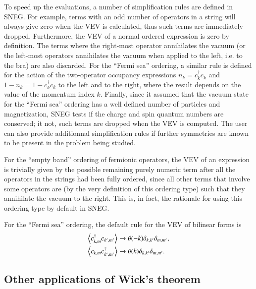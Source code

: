 \documentclass[3p,number,preprint]{elsarticle}
\begin{document}
To speed up the evaluations, a number of simplification rules are
defined in SNEG. For example, terms with an odd number of operators in
a string will always give zero when the VEV is calculated, thus such
terms are immediately dropped. Furthermore, the VEV of a normal
ordered expression is zero by definition. The terms where the
right-most operator annihilates the vacuum (or the left-most operators
annihilates the vacuum when applied to the left, i.e. to the bra) are
also discarded. For the ``Fermi sea'' ordering, a similar rule is
defined for the action of the two-operator occupancy expressions
$n_k=c^\dag_k c_k$ and $1-n_k=1-c^\dag_k c_k$ to the left and to the
right, where the result depends on the value of the momentum index
$k$. Finally, since it assumed that the vacuum state for the ``Fermi
sea'' ordering has a well defined number of particles and
magnetization, SNEG tests if the charge and spin quantum numbers are
conserved; it not, such terms are dropped when the VEV is computed.
The user can also provide additionnal simplification rules if further
symmetries are known to be present in the problem being studied.

For the ``empty band'' ordering of fermionic operators, the VEV of an
expression is trivially given by the possible remaining purely numeric
term after all the operators in the strings had been fully ordered,
since all other terms that involve some operators are (by the very
definition of this ordering type) such that they annihilate the vacuum
to the right. This is, in fact, the rationale for using this ordering
type by default in SNEG.

For the ``Fermi sea'' ordering, the default rule for the VEV of bilinear
forms is
%
\begin{equation}
\begin{split}
\left\langle c^\dag_{k,m} c_{k',m'} \right\rangle &\to \theta(-k) \delta_{k,k'}
\delta_{m,m'}, \\ 
\left\langle c_{k,m} c^\dag_{k',m'} \right\rangle &\to \theta(k)
\delta_{k,k'} \delta_{m,m'}.
\end{split}
\end{equation}


\subsection{Other applications of Wick's theorem}
\end{document}
